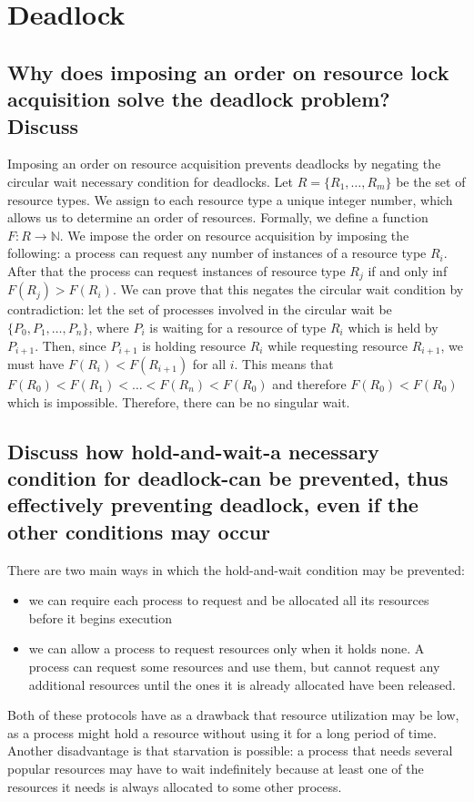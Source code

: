 \documentclass{article}
\begin{document}
\section{Deadlock}

\subsection{Why does imposing an order on resource lock acquisition solve the deadlock problem? Discuss}
Imposing an order on resource acquisition prevents deadlocks by negating the circular wait necessary condition for deadlocks. Let $R=\{R_1,\dots ,R_m\}$ be the set of resource types. We assign to each resource type a unique integer number, which allows us to determine an order of resources. Formally, we define a function $F:R\to \mathbb{N}$. We impose the order on resource acquisition by imposing the following: a process can request any number of instances of a resource type $R_i$. After that the process can request instances of resource type $R_j$ if and only inf $F(R_j)>F(R_i)$. We can prove that this negates the circular wait condition by contradiction: let the set of processes involved in the circular wait be $\{P_0,P_1,\dots ,P_n\}$, where $P_i$ is waiting for a resource of type $R_i$ which is held by $P_{i+1}$. Then, since $P_{i+1}$ is holding resource $R_i$ while requesting resource $R_{i+1}$, we must have $F(R_i)<F(R_{i+1})$ for all $i$. This means that $F(R_0)<F(R_1)<\dots <F(R_n)<F(R_0)$ and therefore $F(R_0)<F(R_0)$ which is impossible. Therefore, there can be no singular wait.

\subsection{Discuss how hold-and-wait-a necessary condition for deadlock-can be prevented, thus effectively preventing deadlock, even if the other conditions may occur}
There are two main ways in which the hold-and-wait condition may be prevented:\begin{itemize}
    \item we can require each process to request and be allocated all its resources before it begins execution
    \item we can allow a process to request resources only when it holds none. A process can request some resources and use them, but cannot request any additional resources until the ones it is already allocated have been released.
\end{itemize}
Both of these protocols have as a drawback that resource utilization may be low, as a process might hold a resource without using it for a long period of time. Another disadvantage is that starvation is possible: a process that needs several popular resources may have to wait indefinitely because at least one of the resources it needs is always allocated to some other process.
\end{document}
